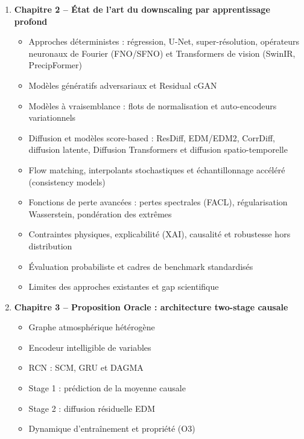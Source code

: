 \documentclass[12pt,a4paper]{article}
\begin{document}
\begin{enumerate}
    \item \textbf{Chapitre 2 -- \'Etat de l'art du downscaling par apprentissage profond}
    \begin{itemize}
        \item Approches d\'eterministes : r\'egression, U-Net, super-r\'esolution, op\'erateurs neuronaux de Fourier (FNO/SFNO) et Transformers de vision (SwinIR, PrecipFormer)
        \item Mod\`eles g\'en\'eratifs adversariaux et Residual cGAN
        \item Mod\`eles \`a vraisemblance : flots de normalisation et auto-encodeurs variationnels
        \item Diffusion et mod\`eles score-based : ResDiff, EDM/EDM2, CorrDiff, diffusion latente, Diffusion Transformers et diffusion spatio-temporelle
        \item Flow matching, interpolants stochastiques et \'echantillonnage acc\'el\'er\'e (consistency models)
        \item Fonctions de perte avanc\'ees : pertes spectrales (FACL), r\'egularisation Wasserstein, pond\'eration des extr\^emes
        \item Contraintes physiques, explicabilit\'e (XAI), causalit\'e et robustesse hors distribution
        \item \'Evaluation probabiliste et cadres de benchmark standardis\'es
        \item Limites des approches existantes et gap scientifique
    \end{itemize}

    \item \textbf{Chapitre 3 -- Proposition Oracle : architecture two-stage causale}
    \begin{itemize}
        \item Graphe atmosph\'erique h\'et\'erog\`ene
        \item Encodeur intelligible de variables
        \item RCN : SCM, GRU et DAGMA
        \item Stage 1 : pr\'ediction de la moyenne causale
        \item Stage 2 : diffusion r\'esiduelle EDM
        \item Dynamique d'entra\^inement et propri\'et\'e (O3)
    \end{itemize}


\end{enumerate}
\end{document}
